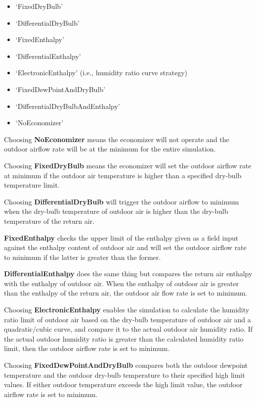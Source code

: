 \begin{itemize}
\item
  `FixedDryBulb'
\item
  `DifferentialDryBulb'
\item
  `FixedEnthalpy'
\item
  `DifferentialEnthalpy'
\item
  `ElectronicEnthalpy' (i.e., humidity ratio curve strategy)
\item
  `FixedDewPointAndDryBulb'
\item
  `DifferentialDryBulbAndEnthalpy'
\item
  `NoEconomizer'
\end{itemize}

Choosing \textbf{NoEconomizer} means the economizer will not operate and the outdoor airflow rate will be at the minimum for the entire simulation.

Choosing \textbf{FixedDryBulb} means the economizer will set the outdoor airflow rate at minimum if the outdoor air temperature is higher than a specified dry-bulb temperature limit.

Choosing \textbf{DifferentialDryBulb} will trigger the outdoor airflow to minimum when the dry-bulb temperature of outdoor air is higher than the dry-bulb temperature of the return air.

\textbf{FixedEnthalpy} checks the upper limit of the enthalpy given as a field input against the enthalpy content of outdoor air and will set the outdoor airflow rate to minimum if the latter is greater than the former.

\textbf{DifferentialEnthalpy} does the same thing but compares the return air enthalpy with the enthalpy of outdoor air. When the enthalpy of outdoor air is greater than the enthalpy of the return air, the outdoor air flow rate is set to minimum.

Choosing \textbf{ElectronicEnthalpy} enables the simulation to calculate the humidity ratio limit of outdoor air based on the dry-bulb temperature of outdoor air and a quadratic/cubic curve, and compare it to the actual outdoor air humidity ratio. If the actual outdoor humidity ratio is greater than the calculated humidity ratio limit, then the outdoor airflow rate is set to minimum.

Choosing \textbf{FixedDewPointAndDryBulb} compares both the outdoor dewpoint temperature and the outdoor dry-bulb temperature to their specified high limit values. If either outdoor temperature exceeds the high limit value, the outdoor airflow rate is set to minimum.

